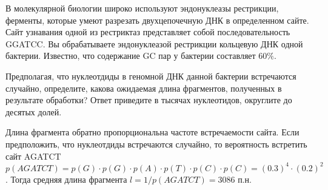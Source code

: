 
В молекулярной биологии широко используют
эндонуклеазы рестрикции, ферменты, которые умеют разрезать двухцепочечную ДНК в
определенном сайте. Сайт узнавания одной из рестриктаз представляет собой
последовательность GGATCC. Вы обрабатываете эндонуклеазой рестрикции кольцевую
ДНК одной бактерии. Известно, что содержание GC пар у бактерии составляет $60\%$.


Предполагая, что нуклеотдиды в геномной ДНК данной бактерии встречаются случайно, определите, какова ожидаемая длина фрагментов, полученных в результате обработки? Ответ
приведите в тысячах нуклеотидов, 
округлите до десятых долей.

\solutionSection

Длина фрагмента обратно пропорциональна частоте встречаемости сайта. 
Если предположить, что нуклеотдиды встречаются случайно, то вероятность встретить сайт 
AGATCT $p(AGATCT)=p(G) \cdot p(G) \cdot p(A) \cdot p(T) \cdot p(C) \cdot p(C)= (0.3)^4 \cdot (0.2)^2$. 
Тогда средняя длина фрагмента $l=1/p(AGATCT) =  3086$ п.н.

